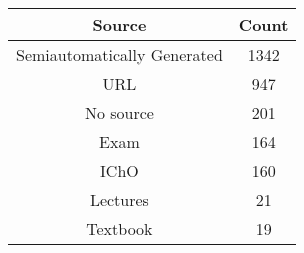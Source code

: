 \begin{tabular}{cc}
\toprule
Source & Count \\
\midrule
Semiautomatically Generated & 1342 \\
URL & 947 \\
No source & 201 \\
Exam & 164 \\
IChO & 160 \\
Lectures & 21 \\
Textbook & 19 \\
\bottomrule
\end{tabular}
